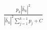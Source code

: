 \documentclass[preview]{standalone}
\begin{document}
\begin{align*}
\frac{p_k\left|{\hat{h}_k}\right|^2}{\left|{\hat{h}_k}\right|^2\sum_{j=1}^{k-1}p_j + C}
\end{align*}
\end{document}
